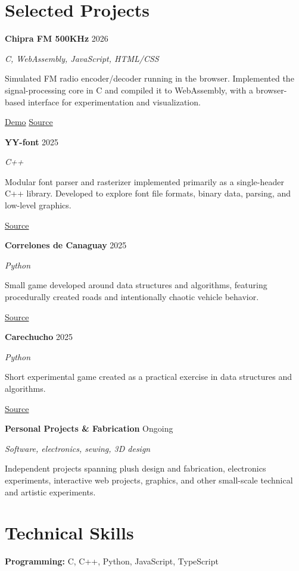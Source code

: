 \documentclass[10pt,a4paper]{article}
\newcommand{\cvproject}[4]{
	\vspace{5mm}
	\textbf{#1}
	\hfill
	{\small\color{lightgray}#2}
	
	\textit{#3}
	
	#4
	
	\vspace{0.35em}
}
\begin{document}
	\section{Selected Projects}
	
	\cvproject
	{Chipra FM 500KHz}
	{2026}
	{C, WebAssembly, JavaScript, HTML/CSS}
	{
		Simulated FM radio encoder/decoder running in the browser.
		Implemented the signal-processing core in C and compiled it
		to WebAssembly, with a browser-based interface for
		experimentation and visualization.
		
		\hfill
		\href{https://alex461538.github.io/chipra-fm/}{Demo}
		\quad
		\href{https://github.com/Alex461538/chipra-fm}{Source}
	}
	
	\cvproject
	{YY-font}
	{2025}
	{C++}
	{
		Modular font parser and rasterizer implemented primarily
		as a single-header C++ library. Developed to explore font
		file formats, binary data, parsing, and low-level graphics.
		
		\hfill
		\href{https://github.com/Alex461538/yyfont}{Source}
	}
	
	\cvproject
	{Correlones de Canaguay}
	{2025}
	{Python}
	{
		Small game developed around data structures and algorithms,
		featuring procedurally created roads and intentionally
		chaotic vehicle behavior.
		
		\hfill
		\href{https://github.com/Alex461538/correlones-de-canaguay}{Source}
	}
	
	\cvproject
	{Carechucho}
	{2025}
	{Python}
	{
		Short experimental game created as a practical exercise
		in data structures and algorithms.
		
		\hfill
		\href{https://github.com/Alex461538/carechucho}{Source}
	}
	
	\cvproject
	{Personal Projects \& Fabrication}
	{Ongoing}
	{Software, electronics, sewing, 3D design}
	{
		Independent projects spanning plush design and fabrication,
		electronics experiments, interactive web projects, graphics,
		and other small-scale technical and artistic experiments.
	}
	
	
	\section{Technical Skills}
	
	\textbf{Programming:}
	C, C++, Python, JavaScript, TypeScript
	
\end{document}
